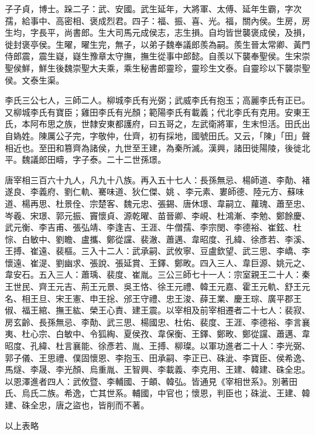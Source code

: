 \begin{pinyinscope}
 子子貞，博士。跺二子：武、安國。武生延年，大將軍、太傅、延年生霸，字次孺，給事中、高密相、褒成烈君。四子：福、振、喜、光。福，關內侯。生房，房生均，字長平，尚書郎。生大司馬元成侯志，志生損。自均皆世襲褒成侯，及損，徙封褒亭侯。生曜，曜生完，無子，以弟子魏奉議郎羨為嗣。羨生晉太常卿、黃門侍郎震，震生嶷，嶷生豫章太守撫，撫生從事中郎懿。自羨以下襲奉聖侯。生宋崇聖侯鮮，鮮生後魏崇聖大夫乘，乘生秘書郎靈珍，靈珍生文泰。自靈珍以下襲崇聖侯。文泰生渠。



 李氏三公七人，三師二人。柳城李氏有光弼；武威李氏有抱玉；高麗李氏有正已。又柳城李氏有寶臣；雞田李氏有光顏；範陽李氏有載義；代北李氏有克用。安東王氏，本阿布思之族，世隸安東都護府，曰五哥之，左武衛將軍，生末怛活。田氏出自媯姓。陳厲公子完，字敬仲，仕齊，初有採地，國號田氏。又云，「陳」「田」聲相近也。至田和篡齊為諸侯，九世至王建，為秦所滅。漢興，諸田徙陽陵，後徙北平。魏議郎田疇，字子泰。二十二世孫璟。



 唐宰相三百六十九人，凡九十八族。再入五十七人：長孫無忌、楊師道、李勣、褚遂良、李義府、劉仁軌、騫味道、狄仁傑、姚、李元素、婁師德、陸元方、蘇味道、楊再思、杜景佺、宗楚客、魏元忠、張錫、唐休璟、韋嗣立、蘿瑰、蕭至忠、岑羲、宋璟、郭元振、竇懷貞、源乾曜、苗晉卿、李峴、杜鴻漸、李勉、鄭餘慶、武元衡、李吉甫、張弘靖、李逢吉、王涯、牛僧孺、李宗閔、李德裕、崔鉉、杜悰、白敏中、劉瞻、盧攜、鄭從讜、裴澈、蕭邁、韋昭度、孔緯、徐彥若、李溪、王搏、崔遠、裴樞。三入十二人：武承嗣、武攸寧、豆盧欽望、武三思、李嶠、李懷遠、崔湜、劉幽求、張說、張延賞、王鐸、鄭畋。四入三人、韋巨源、姚元之、韋安石。五入三人：蕭瑀、裴度、崔胤。三公三師七十一人：宗室親王二十人：秦王世民、齊王元吉、荊王元景、吳王恪、徐王元禮、韓王元嘉、霍王元軌、舒王元名、相王旦、宋王憲、申王捴、邠王守禮、忠王浚、薛王業、慶王琮、廣平郡王俶、福王綰、撫王紘、榮王心責、建王震。以宰相及前宰相遷者二十七人：裴寂、房玄齡、長孫無忌、李勣、武三思、楊國忠、杜佑、裴度、王涯、李德裕、李言襄夷、杜心宗、白敏中、令狐綯、夏侯孜、韋保衡、王鐸、鄭畋、鄭從讜、蕭邁、韋昭度、孔緯、杜言襄能、徐彥若、胤、王搏、柳璨。以軍功進者二十人：李光弼、郭子儀、王思禮、僕固懷恩、李抱玉、田承嗣、李正已、硃泚、李寶臣、侯希逸、馬燧、李晟、李光顏、烏重胤、王智興、李載義、李克用、王建、韓建、硃全忠。以恩澤進者四人：武攸暨、李輔國、于頔、韓弘。皆通見《宰相世系》。別著田氏、烏氏二族。希逸，亡其世系。輔國，中官也；懷恩，判臣也；硃泚、王建、韓建、硃全忠，唐之盜也，皆削而不著。



 以上表略



\end{pinyinscope}